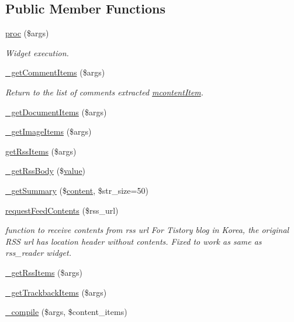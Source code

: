 \subsection*{Public Member Functions}
\begin{DoxyCompactItemize}
\item 
\hyperlink{classmcontent_abdf3692374f645c0a808db2225b9fec3}{proc} (\$args)
\begin{DoxyCompactList}\small\item\em Widget execution. \end{DoxyCompactList}\item 
\hyperlink{classmcontent_a6a077425294207e1e357668b82e30bbf}{\+\_\+get\+Comment\+Items} (\$args)
\begin{DoxyCompactList}\small\item\em Return to the list of comments extracted \hyperlink{classmcontentItem}{mcontent\+Item}. \end{DoxyCompactList}\item 
\hyperlink{classmcontent_a6a6b96bd0a1ce21aab3a350c1584554a}{\+\_\+get\+Document\+Items} (\$args)
\item 
\hyperlink{classmcontent_ac6b1900f46d6b9cbc1c1513a90a63811}{\+\_\+get\+Image\+Items} (\$args)
\item 
\hyperlink{classmcontent_a4b6b633f77c7f2280e1a0fde292b8a62}{get\+Rss\+Items} (\$args)
\item 
\hyperlink{classmcontent_a5d41447024e60278f0cf46cea902da52}{\+\_\+get\+Rss\+Body} (\$\hyperlink{common_2js_2jquery_8js_abe5393d870043cf6aaa1d5ad5fce755c}{value})
\item 
\hyperlink{classmcontent_a4b4f237f52d20441108cadc2ffe0d43c}{\+\_\+get\+Summary} (\$\hyperlink{classcontent}{content}, \$str\+\_\+size=50)
\item 
\hyperlink{classmcontent_a9c74009a166bfac6a467cb27bc2ad214}{request\+Feed\+Contents} (\$rss\+\_\+url)
\begin{DoxyCompactList}\small\item\em function to receive contents from rss url For Tistory blog in Korea, the original R\+SS url has location header without contents. Fixed to work as same as rss\+\_\+reader widget. \end{DoxyCompactList}\item 
\hyperlink{classmcontent_a0fe2153c16b911c8dc3fe1184a72d378}{\+\_\+get\+Rss\+Items} (\$args)
\item 
\hyperlink{classmcontent_a8ef730735e4af7716442ae3c5d1b749a}{\+\_\+get\+Trackback\+Items} (\$args)
\item 
\hyperlink{classmcontent_ad31110bd1251e8de6256b26c279f32c9}{\+\_\+compile} (\$args, \$content\+\_\+items)
\end{DoxyCompactItemize}
